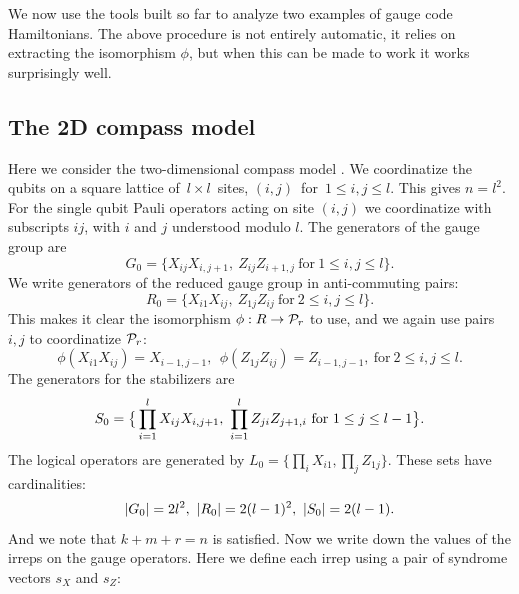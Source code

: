 \documentclass[12pt]{article}
\begin{document}
We now use the tools built so far
to analyze two examples of gauge code Hamiltonians.
The above procedure is not entirely automatic,
it relies on extracting the isomorphism $\phi$,
but when this can be made to work it works surprisingly well.

%
%

\subsection{The 2D compass model}

Here we consider the two-dimensional compass model \cite{Bacon2006}.
We coordinatize the qubits on a square 
lattice of\ $l\times l$\ sites,
$(i, j)$\ for\ $1\le i, j\le l.$
This gives $n = l^2.$
For the single qubit Pauli operators acting on site
$(i, j)$ we coordinatize with subscripts $ij$, 
with $i$ and $j$ understood modulo $l$.
The generators of the gauge group are
$$
    G_0 = \big\{ X_{ij}X_{i,j+1},\ Z_{ij}Z_{i+1,j}\ \mbox{for}\ 1\le i, j\le l\big\}.
$$
We write generators of the reduced
gauge group in anti-commuting pairs:
$$
    R_0 = \big\{ X_{i1}X_{ij},\ Z_{1j}Z_{ij}\ \mbox{for}\ 2\le i, j\le l\big\}.
$$
This makes it clear the isomorphism $\phi : R \to \mathcal{P}_r$ to use,
and we again use pairs $i,j$ to coordinatize $\mathcal{P}_r$:
$$
    \phi(X_{i1}X_{ij}) = X_{i-1,j-1}, \ \ \phi(Z_{1j}Z_{ij}) = Z_{i-1,j-1},\ \mbox{for}\ 2\le i, j\le l.
$$
The generators for the stabilizers are
$$
    \Stab_0 = \big\{ \prod_{i=1}^l X_{ij}X_{i,j+1},\ \prod_{i=1}^l Z_{ji}Z_{j+1,i}\ \mbox{for}\ 1\le j\le l-1\big\}.
$$
The logical operators are generated by $L_0 = \big\{ \prod_i X_{i1}, \prod_j Z_{1j} \}.$
These sets have cardinalities:
$$|G_0|=2l^2,\ |R_0| = 2(l-1)^2,\ |\Stab_0| = 2(l-1).$$
And we note that $k+m+r=n$ is satisfied.
Now we write down the values of the
irreps on the gauge operators.
Here we define each irrep using a pair 
of syndrome vectors $s_X$ and $s_Z:$
\end{document}
